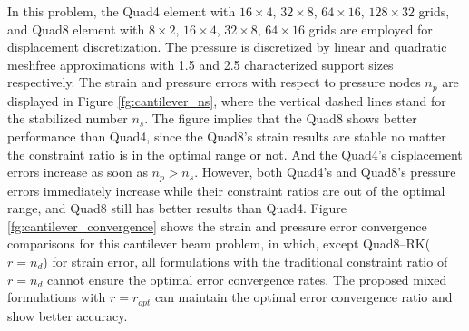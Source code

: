 In this problem, the Quad4 element with $16\times 4$, $32\times 8$, $64\times 16$, $128\times 32$ grids, and Quad8 element with $8\times 2$, $16\times 4$, $32\times 8$, $64\times 16$ grids are employed for displacement discretization. The pressure is discretized by linear and quadratic meshfree approximations with 1.5 and 2.5 characterized support sizes respectively. The strain and pressure errors with respect to pressure nodes $n_p$ are displayed in Figure \ref{fg:cantilever_ns}, where the vertical dashed lines stand for the stabilized number $n_s$. The figure implies that the Quad8 shows better performance than Quad4, since the Quad8's strain results are stable no matter the constraint ratio is in the optimal range or not. And the Quad4's displacement errors increase as soon as $n_p > n_s$. However, both Quad4's and Quad8's pressure errors immediately increase while their constraint ratios are out of the optimal range, and Quad8 still has better results than Quad4. Figure \ref{fg:cantilever_convergence} shows the strain and pressure error convergence comparisons for this cantilever beam problem, in which, except Quad8--RK($r=n_d$) for strain error, all formulations with the traditional constraint ratio of $r=n_d$ cannot ensure the optimal error convergence rates. The proposed mixed formulations with $r=r_{opt}$ can maintain the optimal error convergence ratio and show better accuracy.

